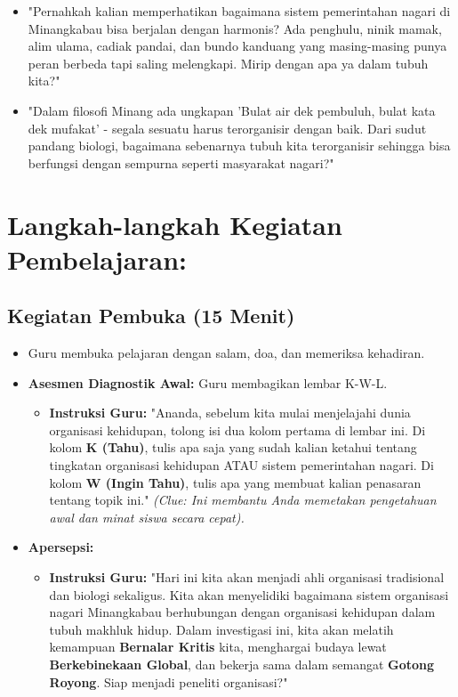 \documentclass[a4paper,12pt]{article}
\begin{document}
\begin{itemize}
\item "Pernahkah kalian memperhatikan bagaimana sistem pemerintahan nagari di Minangkabau bisa berjalan dengan harmonis? Ada penghulu, ninik mamak, alim ulama, cadiak pandai, dan bundo kanduang yang masing-masing punya peran berbeda tapi saling melengkapi. Mirip dengan apa ya dalam tubuh kita?"
\item "Dalam filosofi Minang ada ungkapan 'Bulat air dek pembuluh, bulat kata dek mufakat' - segala sesuatu harus terorganisir dengan baik. Dari sudut pandang biologi, bagaimana sebenarnya tubuh kita terorganisir sehingga bisa berfungsi dengan sempurna seperti masyarakat nagari?"
\end{itemize}

\section{Langkah-langkah Kegiatan Pembelajaran:}

\subsection{Kegiatan Pembuka (15 Menit)}
\begin{itemize}
\item Guru membuka pelajaran dengan salam, doa, dan memeriksa kehadiran.
\item \textbf{Asesmen Diagnostik Awal:} Guru membagikan lembar K-W-L.
    \begin{itemize}
    \item \textbf{Instruksi Guru:} "Ananda, sebelum kita mulai menjelajahi dunia organisasi kehidupan, tolong isi dua kolom pertama di lembar ini. Di kolom \textbf{K (Tahu)}, tulis apa saja yang sudah kalian ketahui tentang tingkatan organisasi kehidupan ATAU sistem pemerintahan nagari. Di kolom \textbf{W (Ingin Tahu)}, tulis apa yang membuat kalian penasaran tentang topik ini." \textit{(Clue: Ini membantu Anda memetakan pengetahuan awal dan minat siswa secara cepat).}
    \end{itemize}
\item \textbf{Apersepsi:}
    \begin{itemize}
    \item \textbf{Instruksi Guru:} "Hari ini kita akan menjadi ahli organisasi tradisional dan biologi sekaligus. Kita akan menyelidiki bagaimana sistem organisasi nagari Minangkabau berhubungan dengan organisasi kehidupan dalam tubuh makhluk hidup. Dalam investigasi ini, kita akan melatih kemampuan \textbf{Bernalar Kritis} kita, menghargai budaya lewat \textbf{Berkebinekaan Global}, dan bekerja sama dalam semangat \textbf{Gotong Royong}. Siap menjadi peneliti organisasi?"
    \end{itemize}
\end{itemize}
\end{document}
